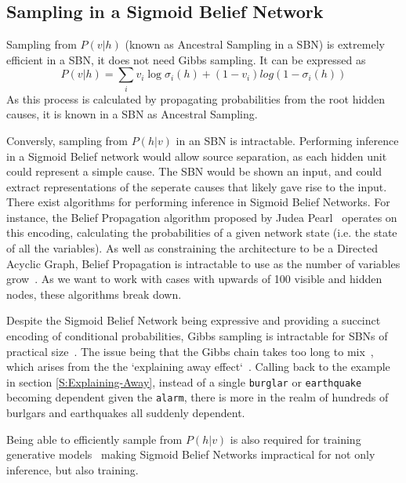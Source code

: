 \subsection{Sampling in a Sigmoid Belief Network}


Sampling from $ P(v|h) $ (known as Ancestral Sampling in a SBN) is extremely efficient in a SBN, it does not need Gibbs sampling. It can be expressed as
\begin{equation}\label{eq:SBN-v-given-h}
P(v|h) = \sum_i v_i \log \sigma_i(h) + (1-v_i)log(1-\sigma_i(h))
\end{equation}
As this process is calculated by propagating probabilities from the root hidden causes, it is known in a SBN as Ancestral Sampling.

Conversly, sampling from $P(h|v)$ in an SBN is intractable. Performing inference in a Sigmoid Belief network would allow source separation, as each hidden unit could represent a simple cause. The SBN would be shown an input, and could extract representations of the seperate causes that likely gave rise to the input. There exist algorithms for performing inference in Sigmoid Belief Networks. For instance, the Belief Propagation algorithm proposed by Judea Pearl~\cite{Pearl1982} operates on this encoding, calculating the probabilities of a given network state (i.e. the state of all the variables). As well as constraining the architecture to be a Directed Acyclic Graph, Belief Propagation is intractable to use as the number of variables grow~\cite{elidan2007using}. As we want to work with cases with upwards of 100 visible and hidden nodes, these algorithms break down.

Despite the Sigmoid Belief Network being expressive and providing a succinct encoding of conditional probabilities, Gibbs sampling is intractable for SBNs of practical size~\cite{Jensen95blockinggibbs}. The issue being that the Gibbs chain takes too long to mix~\cite{neal1992:connectionist}, which arises from the the `explaining away effect`~\cite{Hinton:2006:FLA:1161603.1161605}. Calling back to the example in section \ref{S:Explaining-Away}, instead of a single \texttt{burglar} or \texttt{earthquake} becoming dependent given the \texttt{alarm}, there is more in the realm of hundreds of burlgars and earthquakes all suddenly dependent.

Being able to efficiently sample from $P(h|v)$ is also required for training generative models~\cite{elidan2007using} making Sigmoid Belief Networks impractical for not only inference, but also training.


